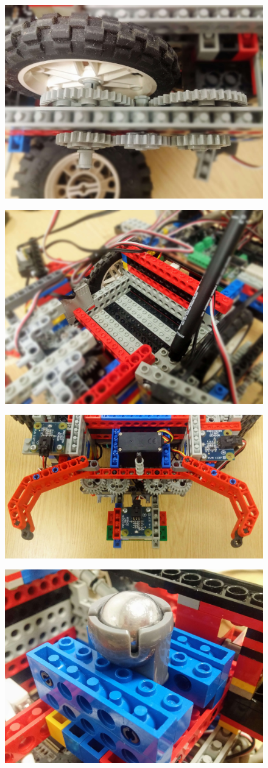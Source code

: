 \begin{figure}[ht]
    \centering
    \includegraphics[width=0.7\linewidth]{res/robot-pics/gear-train-mounted.jpg}
    \caption{}
    \label{fig:}
\end{figure}

\begin{figure}[ht]
    \centering
    \includegraphics[width=0.7\linewidth]{res/robot-pics/battery-slot.jpg}
    \caption{}
    \label{fig:}
\end{figure}

\begin{figure}[ht]
    \centering
    \includegraphics[width=0.7\linewidth]{res/robot-pics/base-detector-and-gripper.jpg}
    \caption{}
    \label{fig:}
\end{figure}

\begin{figure}[ht]
    \centering
    \includegraphics[width=0.7\linewidth]{res/robot-pics/ball-caster-wheel.jpg}
    \caption{}
    \label{fig:}
\end{figure}
